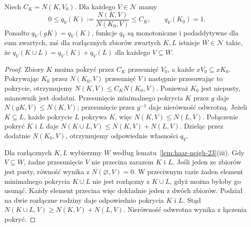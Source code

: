 \begin{lemat}
\label{lem:haar-ratio-23}
Niech $C_K=N(K,V_0)$. Dla każdego $V\in\mathcal N$ mamy
\[
 0\le q_V(K):=\frac{N(K,V)}{N(K_0,V)}\le C_K,
 \qquad q_V(K_0)=1.
\]
Ponadto $q_V(gK)=q_V(K)$, funkcje $q_V$ są monotoniczne
i podaddytywne dla sum zwartych, zaś dla rozłącznych
zbiorów zwartych $K,L$ istnieje $W\in\mathcal N$ takie, że
$q_V(K\cup L)=q_V(K)+q_V(L)$ dla każdego $V\subseteq W$.
\end{lemat}
\begin{proof}
Zbiory $K$ można pokryć przez $C_K$ przesunięć $V_0$,
a każde $xV_0\subseteq xK_0$. Pokrywając $K_0$
przez $N(K_0,V)$ przesunięć $V$ i następnie przesuwając
to pokrycie, otrzymujemy $N(K,V)\le C_KN(K_0,V)$.
Ponieważ $K_0$ jest niepusty, mianownik jest dodatni.
Przesunięcie minimalnego pokrycia $K$ przez $g$ daje
$N(gK,V)\le N(K,V)$; przesunięcie przez $g^{-1}$
daje nierówność odwrotną. Jeżeli $K\subseteq L$,
każde pokrycie $L$ pokrywa $K$, więc
$N(K,V)\le N(L,V)$. Połączenie pokryć $K$ i $L$
daje $N(K\cup L,V)\le N(K,V)+N(L,V)$.
Dzieląc przez dodatnie $N(K_0,V)$, otrzymujemy
odpowiednie własności $q_V$.

Dla rozłącznych $K,L$ wybierzmy $W$ według
lematu~\ref{lem:haar-neigh-23}(iii). Gdy $V\subseteq W$,
żadne przesunięcie $V$ nie przecina zarazem $K$ i $L$.
Jeśli jeden ze zbiorów jest pusty, równość wynika
z $N(\varnothing,V)=0$. W przeciwnym razie żaden
element minimalnego pokrycia $K\cup L$ nie jest
rozłączny z $K\cup L$, gdyż można byłoby go usunąć.
Każdy element przecina więc dokładnie jeden z dwóch
zbiorów. Podział na dwie rozłączne rodziny daje
odpowiednio pokrycia $K$ i $L$. Stąd
$N(K\cup L,V)\ge N(K,V)+N(L,V)$.
Nierówność odwrotna wynika z łączenia pokryć.
\end{proof}

